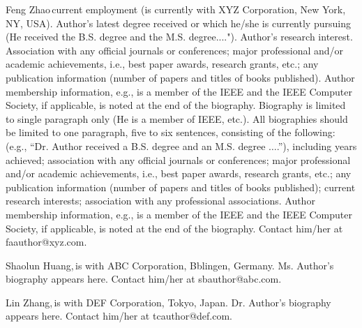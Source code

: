\documentclass{IEEEcsmag}
\begin{document}
\begin{IEEEbiography}{Feng Zhao}{\,}current employment (is
currently with XYZ Corporation, New York, NY, USA). Author's latest degree received or which he/she is currently pursuing (He received the B.S. degree and the M.S. degree...."). Author's research interest. Association with any official journals or conferences; major professional and/or academic achievements, i.e., best paper awards, research grants, etc.; any publication information (number of papers and titles of books published). Author membership information, e.g., is a member of the IEEE and the IEEE Computer Society, if applicable, is noted at the end of the biography. Biography is limited to single paragraph only (He is a member of IEEE, etc.). All biographies should be limited to one paragraph, five to six sentences, consisting of the following: (e.g., ``Dr. Author received a B.S. degree and an M.S. degree $\ldots$.''), including years achieved; association with any official journals or conferences; major professional and/or academic achievements, i.e., best paper awards, research grants, etc.; any publication information (number of papers and titles of books published); current research interests; association with any professional associations. Author membership information, e.g., is a member of the IEEE and the IEEE Computer Society, if applicable, is noted at the end of the biography. Contact him/her at faauthor@xyz.com.
\end{IEEEbiography}

\begin{IEEEbiography}{Shaolun Huang,}{\,}is with ABC Corporation, Bblingen, Germany. Ms. Author's biography appears here.  Contact him/her at sbauthor@abc.com.
\end{IEEEbiography}

\begin{IEEEbiography}{Lin Zhang,}{\,}is with DEF Corporation, Tokyo, Japan. Dr. Author's biography appears here.  Contact him/her at tcauthor@def.com.
\end{IEEEbiography}
\end{document}
